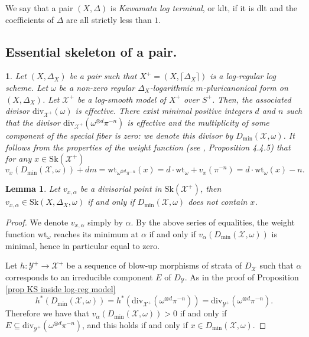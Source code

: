 \documentclass{amsart}%
\numberwithin{equation}{subsection}
\theoremstyle{plain2}
\newtheorem{lemma}[equation]{Lemma}
\theoremstyle{definition2}
\theoremstyle{stepstyle}
\theoremstyle{point}
\theoremstyle{subpoint}
\newtheorem{subpoint}[equation]{}%
\newcommand{\spa}[1]{\begin{subpoint}#1\end{subpoint}}           %
\newcommand{\cX}{\ensuremath{\mathscr{X}}}
\newcommand{\cY}{\ensuremath{\mathscr{Y}}}
\renewcommand{\cY}{\ensuremath{\mathscr{Y}}}
\newcommand{\divisor}{\mathrm{div}}
\newcommand{\weight}{\mathrm{wt}}
\newcommand{\Sk}{\mathrm{Sk}}
\begin{document}
We say that a pair $(X,\Delta)$ is \emph{Kawamata log terminal}, or klt, if it is dlt and the coefficients of $\Delta$ are all strictly less than $1$.

\subsection{Essential skeleton of a pair.}
\spa{Let $(X,\Delta_X)$ be a pair such that $X^+=(X,\lceil \Delta_X \rceil)$ is a log-regular log scheme. Let $\omega$ be a non-zero regular $\Delta_X$-logarithmic $m$-pluricanonical form on $(X,\Delta_X)$. Let $\cX^+$ be a log-smooth model of $X^+$ over $S^+$. Then, the associated divisor $\divisor_{\cX^+}(\omega)$ is effective. There exist minimal positive integers $d$ and $n$ such that the divisor $\divisor_{\cX^+}(\omega^{\otimes d} \pi^{-n})$ is effective and the multiplicity of some component of the special fiber is zero: we denote this divisor by $D_{\min}(\cX,\omega)$. It follows from the properties of the weight function (see \cite{MustataNicaise}, Proposition 4.4.5) that for any $x \in \Sk(\cX^+)$ $$v_x(D_{\min}(\cX,\omega)) + dm = \weight_{\omega^{\otimes d}\pi^{-n}}(x)= d \cdot \weight_{\omega} + v_x(\pi^{-n}) = d \cdot \weight_{\omega}(x) -n.$$
}
\begin{lemma} \label{lemma characterization minimal points}
Let $v_{x,\alpha}$ be a divisorial point in $\Sk(\cX^+)$, then $v_{x,\alpha} \in \Sk(X,\Delta_X, \omega)$ if and only if $D_{\min}(\cX,\omega)$ does not contain $x$.
\end{lemma}
\begin{proof}
We denote $v_{x,\alpha}$ simply by $\alpha$. By the above series of equalities, the weight function $\weight_{\omega}$ reaches its minimum at $\alpha$ if and only if $v_\alpha(D_{\min}(\cX,\omega))$ is minimal, hence in particular equal to zero.

Let $h: \cY^+ \rightarrow \cX^+$ be a sequence of blow-up morphisms of strata of $D_\cX$ such that $\alpha$ corresponds to an irreducible component $E$ of $D_\cY$. As in the proof of Proposition \ref{prop KS inside log-reg model} $$h^*(D_{\min}(\cX,\omega))=h^*(\divisor_{\cX^+} (\omega^{\otimes d} \pi^{-n}))= \divisor_{\cY^+} (\omega^{\otimes d} \pi^{-n}).$$ Therefore we have that $v_\alpha(D_{\min}(\cX,\omega)) >0$ if and only if $E \subseteq \divisor_{\cY^+} (\omega^{\otimes d} \pi^{-n})$, and this holds if and only if $x \in D_{\min}(\cX,\omega)$.
\end{proof}
\end{document}
